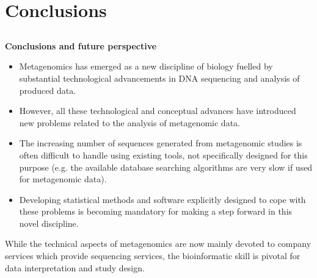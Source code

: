 \documentclass[10pt]{beamer}
\begin{document}
\section{Conclusions}
\subsection{}

\begin{frame}
	\textbf{\Large{Conclusions and future perspective}}
	\small{%
	\begin{itemize}
		\item Metagenomics has emerged as a new discipline of biology fuelled by substantial technological advancements in DNA sequencing and analysis of produced data.
		\item However, all these technological and conceptual advances have introduced new problems related to the analysis of metagenomic data.
		\item  The increasing number of sequences generated from metagenomic studies is often difficult to handle using existing tools, not specifically designed for this purpose (e.g. the available database searching algorithms are very slow if used for metagenomic data).
		\item   Developing statistical methods and software explicitly designed to cope with these problems is becoming mandatory for making a step forward in this novel discipline.
	\end{itemize}
	\pause
	\begin{block}{}
		While the technical aspects of metagenomics are now mainly devoted to company services which provide sequencing services, the bioinformatic skill is pivotal for data interpretation and study design.
	\end{block}		
	}
\end{frame}
\end{document}
